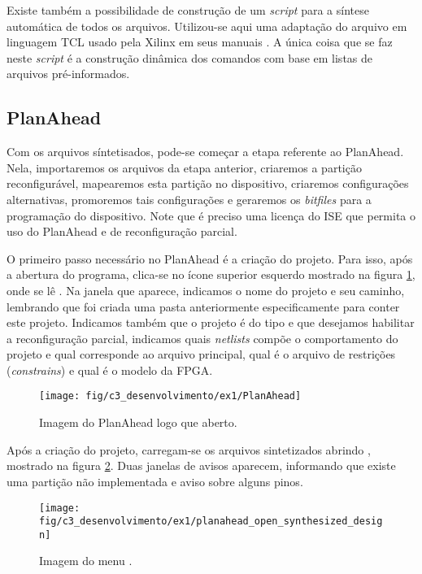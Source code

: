 \documentclass[11pt,a4paper,oneside]{book}
\begin{document}
Existe também a possibilidade de construção de um \textit{script} para a síntese automática de todos os arquivos.
Utilizou-se aqui uma adaptação do arquivo em linguagem TCL usado pela Xilinx em seus manuais \cite{ug702, ug743, ug744}.
A única coisa que se faz neste \textit{script} é a construção dinâmica dos comandos com base em listas de arquivos pré-informados.

\subsection{PlanAhead}
Com os arquivos síntetisados, pode-se começar a etapa referente ao PlanAhead.
Nela, importaremos os arquivos da etapa anterior, criaremos a partição reconfigurável, mapearemos esta partição no dispositivo, criaremos configurações alternativas, promoremos tais configurações e geraremos os \textit{bitfiles} para a programação do dispositivo.
Note que é preciso uma licença do ISE que permita o uso do PlanAhead e de reconfiguração parcial.

O primeiro passo necessário no PlanAhead é a criação do projeto.
Para isso, após a abertura do programa, clica-se no ícone superior esquerdo mostrado na figura \ref{fig:ex1:planahead}, onde se lê .
Na janela que aparece, indicamos o nome do projeto e seu caminho, lembrando que foi criada uma pasta anteriormente especificamente para conter este projeto.
Indicamos também que o projeto é do tipo  e que desejamos habilitar a reconfiguração parcial, indicamos quais \textit{netlists} compõe o comportamento do projeto e qual corresponde ao arquivo principal, qual é o arquivo de restrições (\textit{constrains}) e qual é o modelo da FPGA.

\begin{figure}[h]
\centering
\texttt{[image: fig/c3\_desenvolvimento/ex1/PlanAhead]}
\caption{Imagem do PlanAhead logo que aberto.}
\label{fig:ex1:planahead}
\end{figure}

Após a criação do projeto, carregam-se os arquivos sintetizados abrindo , mostrado na figura \ref{fig:ex1:planahead_open_synthesized_design}.
Duas janelas de avisos aparecem, informando que existe uma partição não implementada e aviso sobre alguns pinos.

\begin{figure}[h]
\centering
\texttt{[image: fig/c3\_desenvolvimento/ex1/planahead\_open\_synthesized\_design]}
\caption{Imagem do menu .}
\label{fig:ex1:planahead_open_synthesized_design}
\end{figure}
\end{document}
